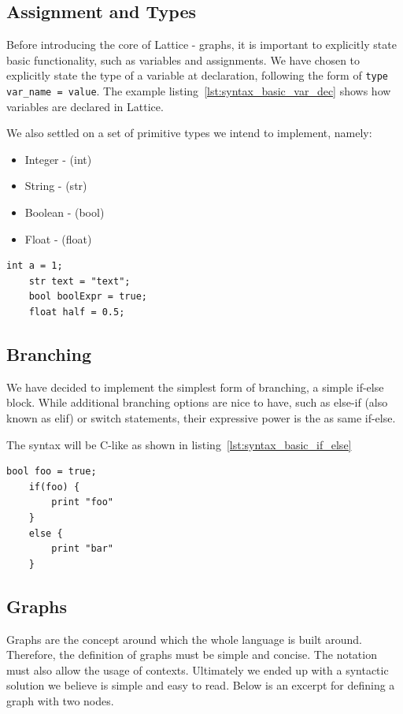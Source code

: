 \subsection{Assignment and Types}\label{subsec:syntax_assignment_and_types}
Before introducing the core of Lattice - graphs, it is important to explicitly state basic functionality,
such as variables and assignments.
We have chosen to explicitly state the type of a variable at declaration,
following the form of \lstinline{type var_name = value}.
The example listing~\ref{lst:syntax_basic_var_dec} shows how variables are declared in Lattice.

We also settled on a set of primitive types we intend to implement, namely:
\begin{itemize}
    \item Integer - (int)
    \item String - (str)
    \item Boolean - (bool)
    \item Float - (float)
\end{itemize}

\begin{lstlisting}[caption={Basic variable declaration.},captionpos=b,label={lst:syntax_basic_var_dec}]
    int a = 1;
    str text = "text";
    bool boolExpr = true;
    float half = 0.5;
\end{lstlisting}



\subsection{Branching}\label{subsec:syntax_branching}
We have decided to implement the simplest form of branching, a simple if-else block.
While additional branching options are nice to have, such as else-if (also known as elif) or switch statements, their
expressive power is the as same if-else.

The syntax will be C-like as shown in listing~\ref{lst:syntax_basic_if_else}
\begin{lstlisting}[caption={Simple branching example.},captionpos=b,label={lst:syntax_basic_if_else}]
    bool foo = true;
    if(foo) {
        print "foo"
    }
    else {
        print "bar"
    }
\end{lstlisting}

\subsection{Graphs}\label{subsec:syntax_graphs}
Graphs are the concept around which the whole language is built around.
Therefore, the definition of graphs
must be simple and concise.
The notation must also allow the usage of contexts.
Ultimately we ended up with a syntactic solution we believe is simple and easy to read.
Below is an excerpt for
defining a graph with two nodes.

